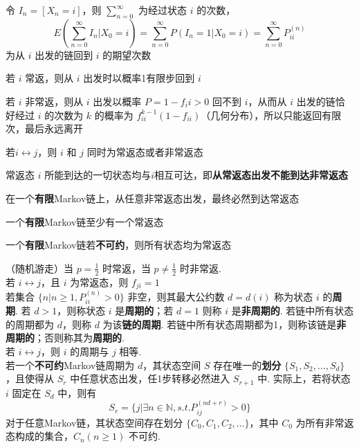 \documentclass[./main.tex]{subfiles}
\begin{document}
\begin{enumerate*}
\item 令 $I_n=[X_n=i]$，则 $\sum_{n=0}^{\infty}$ 为经过状态 $i$ 的次数，$$E(\sum_{n=0}^{\infty}I_n|X_0=i)=\sum_{n=0}^{\infty}P(I_n=1|X_0=i)=\sum_{n=0}^{\infty}P_{ii}^{(n)}$$ 为从 $i$ 出发的链回到 $i$ 的期望次数
\item 若 $i$ 常返，则从 $i$ 出发时以概率1有限步回到 $i$
\item 若 $i$ 非常返，则从 $i$ 出发以概率 $P=1-f_ii>0$ 回不到 $i$，从而从 $i$ 出发的链恰好经过 $i$ 的次数为 $k$ 的概率为 $f_{ii}^{k-1}(1-f_{ii})$（几何分布），所以只能返回有限次，最后永远离开
\end{enumerate*}
\begin{enumerate*}
    \item 若$i\leftrightarrow j$，则 $i$ 和 $j$ 同时为常返态或者非常返态
    \item 常返态 $i$ 所能到达的一切状态均与$i$相互可达，即\textbf{从常返态出发不能到达非常返态}
    \item 在一个\textbf{有限}Markov链上，从任意非常返态出发，最终必然到达常返态
    \item 一个\textbf{有限}Markov链至少有一个常返态
    \item 一个\textbf{有限}Markov链若\textbf{不可约}，则所有状态均为常返态
\end{enumerate*}
（随机游走）当 $p=\frac{1}{2}$ 时常返，当 $p\neq\frac{1}{2}$ 时非常返. \\
若 $i\leftrightarrow j$，且 $i$ 为常返态，则 $f_{ji}=1$\\
若集合 $\{n|n\ge 1,P_{ii}^{(n)}>0\}$ 非空，则其最大公约数 $d=d(i)$ 称为状态 $i$ 的\textbf{周期}. 若 $d>1$，则称状态 $i$ 是\textbf{周期的}；若 $d=1$ 则称 $i$ 是\textbf{非周期的}. 若链中所有状态的周期都为 $d$，则称 $d$ 为该\textbf{链的周期}. 若链中所有状态周期都为1，则称该链是\textbf{非周期的}；否则称其为\textbf{周期的}. \\
若 $i\leftrightarrow j$，则 $i$ 的周期与 $j$ 相等. \\
若一个\textbf{不可约}Markov链周期为 $d$，其状态空间 $S$ 存在唯一的\textbf{划分} $\{S_1,S_2,\dots,S_d\}$，且使得从 $S_r$ 中任意状态出发，任1步转移必然进入 $S_{r+1}$ 中. 实际上，若将状态 $i$ 固定在 $S_d$ 中，则有$$S_r=\{j|\exists n\in\mathbb{N},s.t.P_{ij}^{(nd+r)}>0\}$$
\indent 对于任意Markov链，其状态空间存在划分 $\{C_0,C_1,C_2,\dots\}$，其中 $C_0$ 为所有非常返态构成的集合，$C_n(n\ge 1)$ 不可约. 
\end{document}
